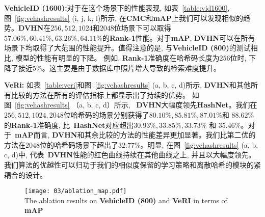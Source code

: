 \textbf{VehicleID (1600):}对于在这个场景下的性能表现, 如表~\ref{table:vid1600}, 图~\ref{fig:vehashresults} (i, j, k, l)所示, 在\textbf{CMC}和\textbf{mAP}上我们可以发现相似的趋势。\textbf{DVHN}在$256, 512, 1024$和$2048$位场景下可以取得$57.06\%, 60.41\%, 63.26\%,64.11\%$的\textbf{Rank-1}性能。对于\textbf{mAP}, \textbf{DVHN}可以在所有场景下均取得了大范围的性能提升。值得注意的是, 与\textbf{VehicleID (800)}的测试相比, 模型的性能有明显的下降。 例如, \textbf{Rank-1}准确度在哈希码长度为$256$位时, 下降了接近$5 \%$。这主要是由于数据库中照片增大导致的检索难度提升。 \par
\textbf{VeRi: }如表~\ref{table:veri}和图~\ref{fig:vehashresults} (a, b, c, d)所示, \textbf{DVHN}和其他所有比较的方法在所有的评估指标上都显示出了持续的优势。 如图~\ref{fig:vehashresults} （a, b, c, d）所示, ~\textbf{DVHN}大幅度领先\textbf{HashNet}。我们在$256,512,1024,2048$位哈希码的场景分别获得了$80.10\%, 85.81\%, 87.01\% $和 $88.62\%$的\textbf{Rank-1}准确度, 比~\textbf{HashNet}对应超出$30.93\%, 33.85\%, 33.73\%$ 和 $35.46\%$。对于~\textbf{mAP}而言, \textbf{DVHN}和其余比较的方法的性能差异更加显著。我们比第二优的方法在$2048$位的哈希码场景下超出了$32.77 \%$。明显, 在图~\ref{fig:vehashresults} (a, b, c, d)中, 代表~\textbf{DVHN}性能的红色曲线持续在其他曲线之上, 并且以大幅度领先。我们算法的优越性可以归功于我们的相似度保留的学习策略和离散哈希的模块的紧耦合的设计。

\begin{figure}[!htp]
    \centering
    \texttt{[image: 03/ablation\_map.pdf]} \\
      {The ablation results on \textbf{VehicleID (800)} and \textbf{VeRI} in terms of \textbf{mAP}}
   \label{fig:ablationmap}
\end{figure}


